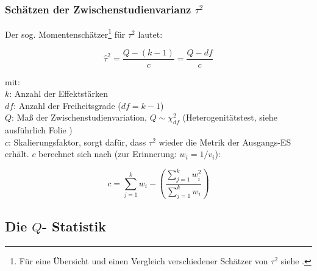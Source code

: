 \begin{frame}
  \frametitle{Schätzen der Zwischenstudienvarianz $\tau^2$}

  \begin{footnotesize}
    Der sog. Momentenschätzer\footnote{Für eine Übersicht und einen Vergleich
      verschiedener Schätzer von $\tau^2$ siehe \citet{viechtbauer_bias_2005}.}
    für $\tau^2$ lautet:

  \begin{equation*}
    \widehat{\tau}^2 = \frac{Q-(k-1)}{c} =  \frac{Q-df}{c}
  \end{equation*}

  mit:\\
  $k$: Anzahl der Effektstärken\\
  $df$: Anzahl der Freiheitsgrade ($df = k-1$)\\
  $Q$: Maß der Zwischenstudienvariation, $Q \sim \chi_{df}^2$
  (Heterogenitätstest, siehe ausführlich Folie \pageref{sec:die-q-statistik}) \\
  $c$: Skalierungsfaktor, sorgt dafür, dass $\tau^2$ wieder die Metrik der
  Ausgangs-ES erhält. $c$ berechnet sich nach (zur Erinnerung: $w_i = 1/v_i$):

  \begin{equation}
    c = \sum\limits^k_{j = 1}w_i - \left(\frac{\sum\limits^k_{j = 1}w_i^2}{\sum\limits^k_{j = 1}w_i}\right)
  \end{equation}
\end{footnotesize}
\end{frame}





\subsection{Die $Q$- Statistik}\label{sec:die-q-statistik}

